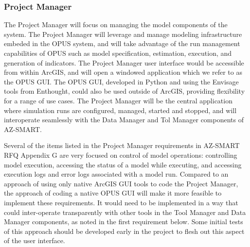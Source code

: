 
\subsubsection{Project Manager}

The Project Manager will focus on managing the model components of the system. The Project Manager will leverage and manage modeling infrastructure embeded in the OPUS system, and will take advantage of the run management capabilities of OPUS such as model specification, estimation, execution, and generation of indicators.  The Project Manager user interface would be accessible from within ArcGIS, and will open a windowed application which we refer to as the OPUS GUI.  The OPUS GUI, developed in Python and using the Envisage tools from Enthought, could also be used outside of ArcGIS, providing flexibility for a range of use cases.  The Project Manager will be the central application where simulation runs are configured, managed, started and stopped, and will interoperate seamlessly with the Data Manager and Tol Manager components of AZ-SMART.

Several of the items listed in the Project Manager requirements in AZ-SMART RFQ Appendix G are very focused on control of model operations: controlling model execution, accessing the status of a model while executing, and accessing execution logs and error logs associated with a model run.  Compared to an approach of using only native ArcGIS GUI tools to code the Project Manager, the approach of coding a native OPUS GUI will make it more feasible to implement these requirements.  It would need to be implemented in a way that could inter-operate transparently with other tools in the Tool Manager and Data Manager components, as noted in the first requirement below. Some initial tests of this approach should be developed early in the project to flesh out this aspect of the user interface.

